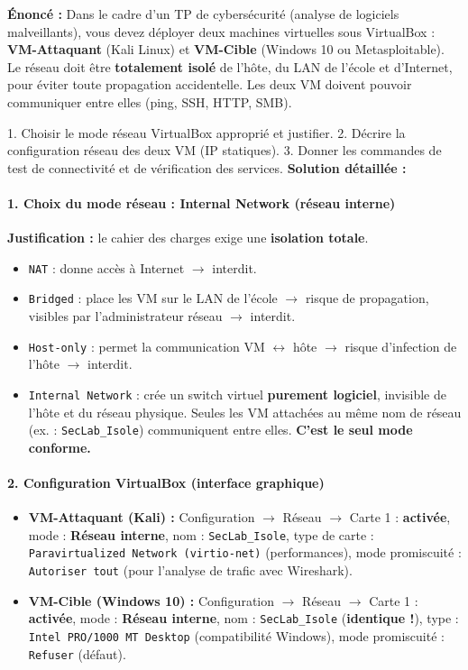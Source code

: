 \documentclass[11pt]{article}
\begin{document}
\begin{exoresolu}
\textbf{Énoncé :} Dans le cadre d'un TP de cybersécurité (analyse de logiciels malveillants), vous devez déployer deux machines virtuelles sous VirtualBox : \textbf{VM-Attaquant} (Kali Linux) et \textbf{VM-Cible} (Windows 10 ou Metasploitable). Le réseau doit être \textbf{totalement isolé} de l'hôte, du LAN de l'école et d'Internet, pour éviter toute propagation accidentelle. Les deux VM doivent pouvoir communiquer entre elles (ping, SSH, HTTP, SMB).\par
1. Choisir le mode réseau VirtualBox approprié et justifier. 2. Décrire la configuration réseau des deux VM (IP statiques). 3. Donner les commandes de test de connectivité et de vérification des services.
\tcblower
\textbf{Solution détaillée :}

\paragraph{1. Choix du mode réseau : \textbf{Internal Network (réseau interne)}}
\textbf{Justification :} le cahier des charges exige une \textbf{isolation totale}.
\begin{itemize}
    \item \texttt{NAT} : donne accès à Internet $\rightarrow$ interdit.
    \item \texttt{Bridged} : place les VM sur le LAN de l'école $\rightarrow$ risque de propagation, visibles par l'administrateur réseau $\rightarrow$ interdit.
    \item \texttt{Host-only} : permet la communication VM $\leftrightarrow$ hôte $\rightarrow$ risque d'infection de l'hôte $\rightarrow$ interdit.
    \item \texttt{Internal Network} : crée un switch virtuel \textbf{purement logiciel}, invisible de l'hôte et du réseau physique. Seules les VM attachées au même nom de réseau (ex. : \texttt{SecLab\_Isole}) communiquent entre elles. \textbf{C'est le seul mode conforme.}
\end{itemize}

\paragraph{2. Configuration VirtualBox (interface graphique)}
\begin{itemize}
    \item \textbf{VM-Attaquant (Kali) :} Configuration $\rightarrow$ Réseau $\rightarrow$ Carte 1 : \textbf{activée}, mode : \textbf{Réseau interne}, nom : \texttt{SecLab\_Isole}, type de carte : \texttt{Paravirtualized Network (virtio-net)} (performances), mode promiscuité : \texttt{Autoriser tout} (pour l'analyse de trafic avec Wireshark).
    \item \textbf{VM-Cible (Windows 10) :} Configuration $\rightarrow$ Réseau $\rightarrow$ Carte 1 : \textbf{activée}, mode : \textbf{Réseau interne}, nom : \texttt{SecLab\_Isole} (\textbf{identique !}), type : \texttt{Intel PRO/1000 MT Desktop} (compatibilité Windows), mode promiscuité : \texttt{Refuser} (défaut).
\end{itemize}


\end{exoresolu}
\end{document}
